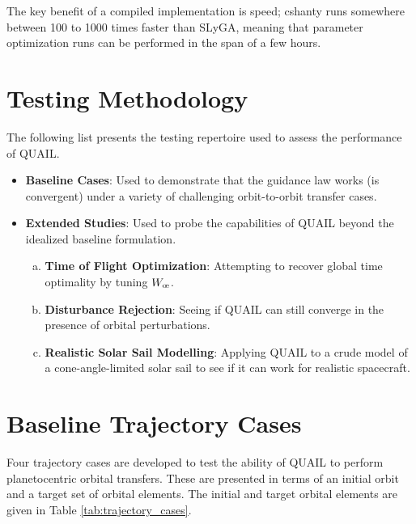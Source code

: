 The key benefit of a compiled implementation is speed; cshanty runs somewhere between 100 to 1000 times faster than SLyGA, meaning that parameter optimization runs can be performed in the span of a few hours.

\section{Testing Methodology}
The following list presents the testing repertoire used to assess the performance of QUAIL.

\begin{itemize}
  \item\textbf{Baseline Cases}: Used to demonstrate that the guidance law works (is convergent) under a variety of challenging orbit-to-orbit transfer cases.
  \item\textbf{Extended Studies}: Used to probe the capabilities of QUAIL beyond the idealized baseline formulation.
        \begin{enumerate}[(a)]
          \item\textbf{Time of Flight Optimization}: Attempting to recover global time optimality by tuning \(W_\moe\).
          \item\textbf{Disturbance Rejection}: Seeing if QUAIL can still converge in the presence of orbital perturbations.
          \item\textbf{Realistic Solar Sail Modelling}: Applying QUAIL to a crude model of a cone-angle-limited solar sail to see if it can work for realistic spacecraft.
        \end{enumerate}
\end{itemize}

\section{Baseline Trajectory Cases}
Four trajectory cases are developed to test the ability of QUAIL to perform planetocentric orbital transfers. These are presented in terms of an initial orbit and a target set of orbital elements. The initial and target orbital elements are given in Table \ref{tab:trajectory_cases}.

